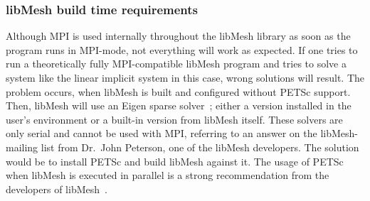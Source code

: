  
  \subsubsection{libMesh build time requirements}\label{sec:Impl-Parallel-Requirements}
   Although MPI is used internally throughout the libMesh library as soon as the program runs in MPI-mode, not everything will work as expected. If one tries to run a theoretically fully MPI-compatible libMesh program and tries to solve a system like the linear implicit system in this case, wrong solutions will result. The problem occurs, when libMesh is built and configured without PETSc support. Then, libMesh will use an Eigen sparse solver~\cite{eigen-url}; either a version installed in the user's environment or a built-in version from libMesh itself. These solvers are only serial and cannot be used with MPI, referring to an answer on the libMesh-mailing list from Dr.\ John Peterson, one of the libMesh developers. The solution would be to install PETSc and build libMesh against it. The usage of PETSc when libMesh is executed in parallel is a strong recommendation from the developers of libMesh~\cite{libmeshMailList}.
 
 
 
